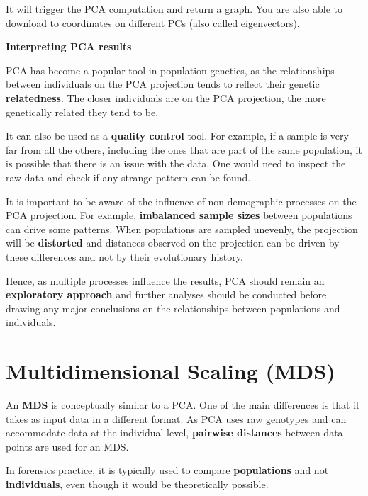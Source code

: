 \documentclass[
]{book}
\begin{document}
It will trigger the PCA computation and return a graph. You are also able to
download to coordinates on different PCs (also called eigenvectors).

\begin{interpretation}
\textbf{Interpreting PCA results}

PCA has become a popular tool in population genetics, as the relationships between
individuals on the PCA projection tends to reflect their genetic \textbf{relatedness}. The
closer individuals are on the PCA projection, the more genetically related they tend to be.

It can also be used as a \textbf{quality control} tool. For example, if a sample is very far
from all the others, including the ones that are part of the same population,
it is possible that there is an issue with the data. One would need to inspect
the raw data and check if any strange pattern can be found.

It is important to be aware of the influence of non demographic processes on
the PCA projection. For example, \textbf{imbalanced sample sizes} between populations
can drive some patterns. When populations are sampled unevenly, the projection will
be \textbf{distorted} and distances observed on the projection can be driven by these
differences and not by their evolutionary history.

Hence, as multiple processes influence the results, PCA should remain an
\textbf{exploratory approach} and further analyses should be conducted before drawing
any major conclusions on the relationships between populations and individuals.

\end{interpretation}

\hypertarget{multidimensional-scaling-mds}{%
\section{Multidimensional Scaling (MDS)}\label{multidimensional-scaling-mds}}

An \textbf{MDS} is conceptually similar to a PCA. One of the main differences is
that it takes as input data in a different format. As PCA uses raw genotypes and
can accommodate data at the individual level, \textbf{pairwise distances} between data
points are used for an MDS.

In forensics practice, it is typically used to compare \textbf{populations} and not
\textbf{individuals}, even though it would be theoretically possible.
\end{document}
